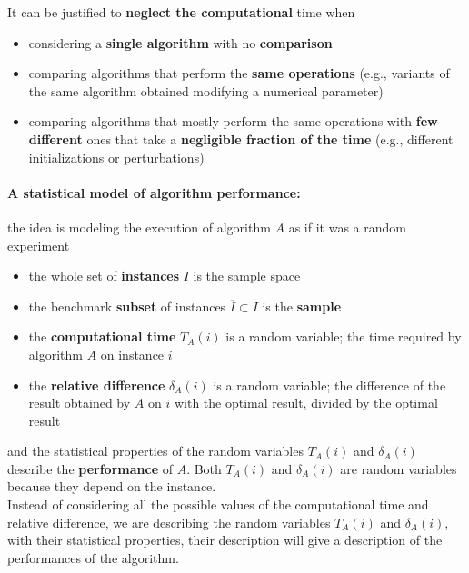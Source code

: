 It can be justified to \textbf{neglect the computational} time when
\begin{itemize}
	\item considering a \textbf{single algorithm} with no \textbf{comparison} 
	\item comparing algorithms that perform the \textbf{same operations} (e.g., variants of the same algorithm obtained modifying a numerical parameter)
	\item comparing algorithms that mostly perform the same operations with \textbf{few different} ones that take a \textbf{negligible fraction of the time} (e.g., different initializations or perturbations)
\end{itemize}

\paragraph{A statistical model of algorithm performance:} the idea is modeling the execution of algorithm $A$ as if it was a random experiment
\begin{itemize}
	\item the whole set of \textbf{instances} $I$ is the sample space
	\item the benchmark \textbf{subset} of instances $\overline{I} \subset I$ is the \textbf{sample}
	\item the \textbf{computational time} $T_A (i)$ is a random variable; the time required by algorithm $A$ on instance $i$
	\item the \textbf{relative difference} $\delta_A (i )$ is a random variable; the difference of the result obtained by $A$ on $i$ with the optimal result, divided by the optimal result
\end{itemize}
and the statistical properties of the random variables $T_A (i )$ and $\delta_A (i )$ describe the \textbf{performance} of $A$. Both $T_A (i)$ and $\delta_A (i)$ are random variables because they depend on the instance. \\

Instead of considering all the possible values of the computational time and relative difference, we are describing the random variables $T_A (i)$ and $\delta_A (i)$, with their statistical properties, their description will give a description of the performances of the algorithm.\\

\newpage

